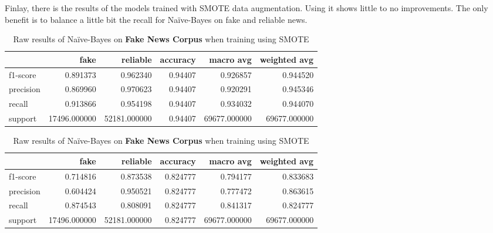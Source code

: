 Finlay, there is the results of the models trained with SMOTE data augmentation. Using it shows little to no improvements. The only benefit is to balance a little bit the recall for Na\"{i}ve-Bayes on fake and reliable news. 

\begin{table}
\begin{subtable}{\textwidth}
	\begin{tabular}{lrrrrr}
	\toprule
	{} &          fake &      reliable &  accuracy &     macro avg &  weighted avg \\
	\midrule
	f1-score  &      0.891373 &      0.962340 &   0.94407 &      0.926857 &      0.944520 \\
	precision &      0.869960 &      0.970623 &   0.94407 &      0.920291 &      0.945346 \\
	recall    &      0.913866 &      0.954198 &   0.94407 &      0.934032 &      0.944070 \\
	support   &  17496.000000 &  52181.000000 &   0.94407 &  69677.000000 &  69677.000000 \\
	\bottomrule
	\end{tabular}
	\caption{Raw results of linear svm on \textbf{Fake News Corpus} when training using SMOTE}
\end{subtable}

\begin{subtable}{\textwidth}
	\begin{tabular}{lrrrrr}
	\toprule
	{} &          fake &      reliable &  accuracy &     macro avg &  weighted avg \\
	\midrule
	f1-score  &      0.714816 &      0.873538 &  0.824777 &      0.794177 &      0.833683 \\
	precision &      0.604424 &      0.950521 &  0.824777 &      0.777472 &      0.863615 \\
	recall    &      0.874543 &      0.808091 &  0.824777 &      0.841317 &      0.824777 \\
	support   &  17496.000000 &  52181.000000 &  0.824777 &  69677.000000 &  69677.000000 \\
	\bottomrule
	\end{tabular}
	\caption{Raw results of Na\"{i}ve-Bayes on \textbf{Fake News Corpus} when training using SMOTE}
\end{subtable}


\end{table}
